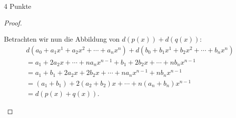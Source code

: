 \documentclass{problemset}
\begin{document}
\begin{problem}{4 Punkte}
\begin{proof}
\begin{enumerate}
              Betrachten wir nun die Abbildung von $d(p(x)) + d(q(x))$:
              \begin{align}
                   & d(a_0 + a_1x^1 + a_2x^2 + \cdots + a_nx^n) + d(b_0 + b_1x^1 + b_2x^2 + \cdots + b_nx^n) \\
                   & = a_1 + 2a_2x + \cdots + na_nx^{n-1} + b_1 + 2b_2x + \cdots + nb_nx^{n-1}               \\
                   & = a_1 + b_1 + 2a_2x + 2b_2x + \cdots + na_nx^{n-1} + nb_nx^{n-1}                        \\
                   & = (a_1 + b_1) + 2(a_2 + b_2)x + \cdots + n(a_n+b_n)x^{n-1}                              \\
                   & = d(p(x) + q(x)).
              \end{align}


\end{enumerate}
\end{proof}
\end{problem}
\end{document}
